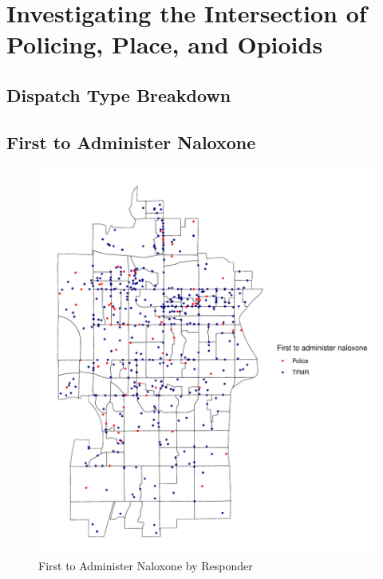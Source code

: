 \chapter{Investigating the Intersection of Policing, Place, and Opioids}

\section{Dispatch Type Breakdown}


\newpage

\section{First to Administer Naloxone}
\begin{figure}
    \centering
    \caption{First to Administer Naloxone by Responder}
    \includegraphics{figures/first-to-admin.pdf}
\end{figure}